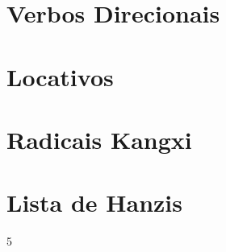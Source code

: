 \documentclass[a4paper,9pt,twoside,openright]{memoir}
\begin{document}
\clearpage
\chapter{Verbos Direcionais}


\clearpage
\chapter{Locativos}


\clearpage
\chapter{Radicais Kangxi}


\fi

\clearpage
\chapter{Lista de Hanzis}                                                           
\begin{multicols}{5}
 \begin{KeepFromToc}
  \listoffirsthanzis
 \end{KeepFromToc}
\end{multicols}
\end{document}

